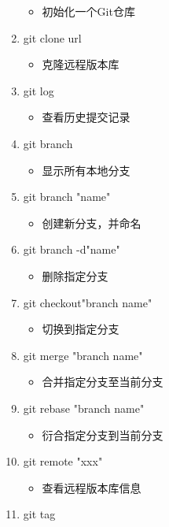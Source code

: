 \documentclass[a4paper, 12pt]{article}
\begin{document}
\begin{enumerate}
\begin{itemize}
      \item 初始化一个Git仓库 
    \end{itemize}
    \item {\large git clone url}
    \begin{itemize}
      \item 克隆远程版本库
    \end{itemize}
    \item {\large git log}
    \begin{itemize}
      \item 查看历史提交记录
    \end{itemize}
    \item {\large git branch}
    \begin{itemize}
      \item 显示所有本地分支
    \end{itemize}
    \item {\large git branch "name"}
    \begin{itemize}
      \item 创建新分支，并命名
    \end{itemize}
    \item {\large git branch -d"name"}
    \begin{itemize}
      \item 删除指定分支
    \end{itemize}
    \item {\large git checkout"branch name"}
    \begin{itemize}
      \item 切换到指定分支
    \end{itemize}
    \item {\large git merge "branch name"}
    \begin{itemize}
      \item 合并指定分支至当前分支
    \end{itemize}
    \item {\large git rebase "branch name"}
    \begin{itemize}
      \item 衍合指定分支到当前分支
    \end{itemize}
    \item {\large git remote "xxx"}
    \begin{itemize}
      \item 查看远程版本库信息
    \end{itemize}
    \newpage
    \item {\large git tag}

\end{enumerate}
\end{document}
